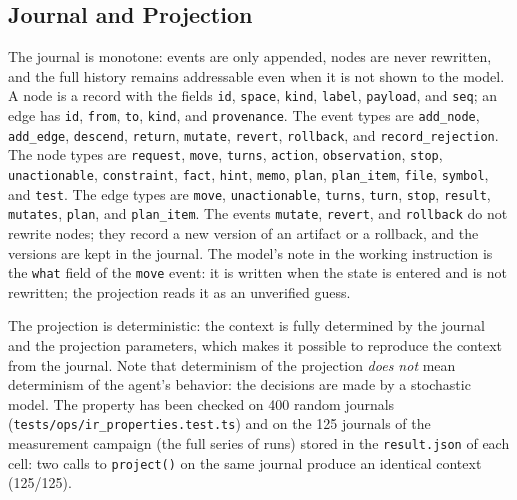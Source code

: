 \documentclass[11pt,a4paper]{article}
\begin{document}
\subsection{Journal and Projection}

The journal is monotone: events are only appended, nodes are never rewritten, and the full
history remains addressable even when it is not shown to the model. A node is a record with the
fields \texttt{id}, \texttt{space}, \texttt{kind}, \texttt{label}, \texttt{payload}, and
\texttt{seq}; an edge has \texttt{id}, \texttt{from}, \texttt{to}, \texttt{kind}, and
\texttt{provenance}. The event types are \texttt{add\_node}, \texttt{add\_edge},
\texttt{descend}, \texttt{return}, \texttt{mutate}, \texttt{revert}, \texttt{rollback}, and
\texttt{record\_rejection}. The node types are \texttt{request}, \texttt{move}, \texttt{turns},
\texttt{action}, \texttt{observation}, \texttt{stop}, \texttt{unactionable},
\texttt{constraint}, \texttt{fact}, \texttt{hint}, \texttt{memo}, \texttt{plan},
\texttt{plan\_item}, \texttt{file}, \texttt{symbol}, and \texttt{test}. The edge types are
\texttt{move}, \texttt{unactionable}, \texttt{turns}, \texttt{turn}, \texttt{stop},
\texttt{result}, \texttt{mutates}, \texttt{plan}, and \texttt{plan\_item}. The events
\texttt{mutate}, \texttt{revert}, and \texttt{rollback} do not rewrite nodes; they record a new
version of an artifact or a rollback, and the versions are kept in the journal. The model's
note in the working instruction is the \texttt{what} field of the \texttt{move} event: it is
written when the state is entered and is not rewritten; the projection reads it as an unverified
guess.

The projection is deterministic: the context is fully determined by the journal and the
projection parameters, which makes it possible to reproduce the context from the journal. Note
that determinism of the projection \emph{does not} mean determinism of the agent's behavior:
the decisions are made by a stochastic model. The property has been checked on 400 random
journals (\texttt{tests/ops/ir\_properties.test.ts}) and on the 125 journals of the measurement campaign (the full series of runs) stored in
the \texttt{result.json} of each cell: two calls to \texttt{project()} on the same journal
produce an identical context (125/125).
\end{document}
